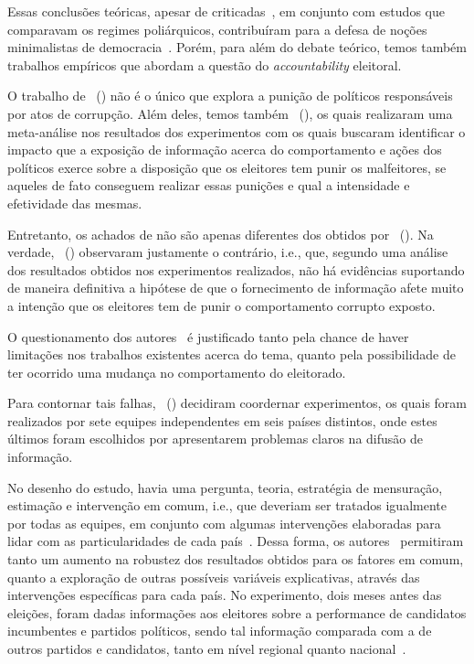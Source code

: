\documentclass[
	12pt,				%
	openright,			%
	twoside,			%
	a4paper,			%
	openany,
	english,			%
	brazil				%
	]{abntex2}
\begin{document}
Essas conclusões teóricas, apesar de criticadas~\cite{Coleman1986Oct}, em conjunto com estudos que comparavam os regimes poliárquicos, contribuíram para a defesa de noções minimalistas de democracia~\cite{przeworski19992}. Porém, para além do debate teórico, temos também trabalhos empíricos que abordam a questão do \textit{accountability} eleitoral.

O trabalho de ~(\citeyear{ferraz2008exposing}) não é o único que explora a punição de políticos responsáveis por atos de corrupção. Além deles, temos também ~(\citeyear{dunning2019voter}), os quais realizaram uma meta-análise nos resultados dos experimentos com os quais buscaram identificar o impacto que a exposição de informação acerca do comportamento e ações dos políticos exerce sobre a disposição que os eleitores tem punir os malfeitores, se aqueles de fato conseguem realizar essas punições e qual a intensidade e efetividade das mesmas.

Entretanto, os achados de \cite{dunning2019voter} não são apenas diferentes dos obtidos por ~(\citeyear{ferraz2008exposing}). Na verdade, ~(\citeyear{dunning2019voter}) observaram justamente o contrário, i.e., que, segundo uma análise dos resultados obtidos nos experimentos realizados, não há evidências suportando de maneira definitiva a hipótese de que o fornecimento de informação afete muito a intenção que os eleitores tem de punir o comportamento corrupto exposto.

O questionamento dos autores~\cite{dunning2019voter} é justificado tanto pela chance de haver limitações nos trabalhos existentes acerca do tema, quanto pela possibilidade de ter ocorrido uma mudança no comportamento do eleitorado.

Para contornar tais falhas, ~(\citeyear{dunning2019voter}) decidiram coordernar experimentos, os quais foram realizados por sete equipes independentes em seis países distintos, onde estes últimos foram escolhidos por apresentarem problemas claros na difusão de informação.

No desenho do estudo, havia uma pergunta, teoria, estratégia de mensuração, estimação e intervenção em comum, i.e., que deveriam ser tratados igualmente por todas as equipes, em conjunto com algumas intervenções elaboradas para lidar com as particularidades de cada país~\cite{dunning2019voter}. Dessa forma, os autores~\cite{dunning2019voter} permitiram tanto um aumento na robustez dos resultados obtidos para os fatores em comum, quanto a exploração de outras possíveis variáveis explicativas, através das intervenções específicas para cada país. No experimento, dois meses antes das eleições, foram dadas informações aos eleitores sobre a performance de candidatos incumbentes e partidos políticos, sendo tal informação comparada com a de outros partidos e candidatos, tanto em nível regional quanto nacional~\cite{dunning2019voter}. 
\end{document}
